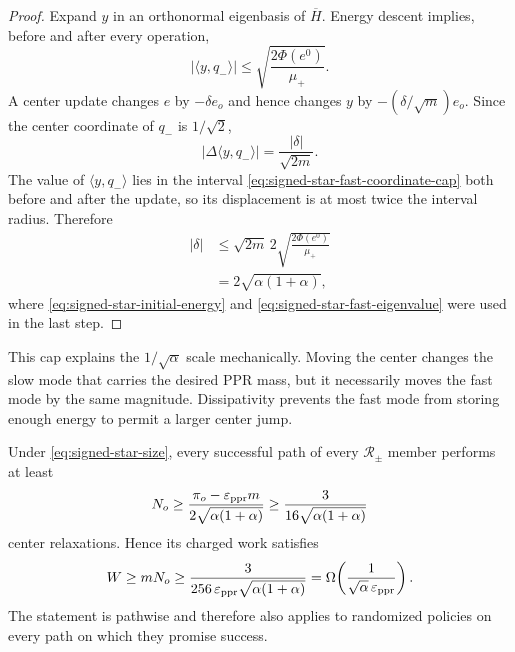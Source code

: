 \begin{proof}
Expand $y$ in an orthonormal eigenbasis of $\overline H$.  Energy descent
implies, before and after every operation,
\begin{equation}
  |\langle y,q_-\rangle|
  \le\sqrt{\frac{2\Phi(e^0)}{\mu_+}}.
  \label{eq:signed-star-fast-coordinate-cap}
\end{equation}
A center update changes $e$ by $-\delta e_o$ and hence changes $y$ by
$-(\delta/\sqrt m)e_o$.  Since the center coordinate of $q_-$ is
$1/\sqrt2$,
\begin{equation}
  |\Delta\langle y,q_-\rangle|
  =\frac{|\delta|}{\sqrt{2m}}.
  \label{eq:signed-star-equal-mode-movement}
\end{equation}
The value of $\langle y,q_-\rangle$ lies in the interval
\eqref{eq:signed-star-fast-coordinate-cap} both before and after the update,
so its displacement is at most twice the interval radius.  Therefore
\begin{align*}
  |\delta|
  &\le\sqrt{2m}\,2
       \sqrt{\frac{2\Phi(e^0)}{\mu_+}} \\
  &=2\sqrt{\alpha(1+\alpha)},
\end{align*}
where \eqref{eq:signed-star-initial-energy} and
\eqref{eq:signed-star-fast-eigenvalue} were used in the last step.
\end{proof}

This cap explains the $1/\sqrt\alpha$ scale mechanically.  Moving the center
changes the slow mode that carries the desired PPR mass, but it necessarily
moves the fast mode by the same magnitude.  Dissipativity prevents the fast
mode from storing enough energy to permit a larger center jump.

\begin{theorem}
\label{thm:signed-star-signed-lower}
Under \eqref{eq:signed-star-size}, every successful path of every
$\mathcal R_{\pm}$ member performs at least
\begin{equation}
  N_o
  \ge\frac{\pi_o-\varepsilon_{\rm ppr}m}
           {2\sqrt{\alpha(1+\alpha)}}
  \ge\frac{3}{16\sqrt{\alpha(1+\alpha)}}
  \label{eq:signed-star-center-count-lower}
\end{equation}
center relaxations.  Hence its charged work satisfies
\begin{equation}
  W
  \ge mN_o
  \ge\frac{3}
      {256\,\varepsilon_{\rm ppr}\sqrt{\alpha(1+\alpha)}}
  =\Omega\!\left(
      \frac{1}{\sqrt\alpha\,\varepsilon_{\rm ppr}}
    \right).
  \label{eq:signed-star-signed-work-lower}
\end{equation}
The statement is pathwise and therefore also applies to randomized policies
on every path on which they promise success.
\end{theorem}

